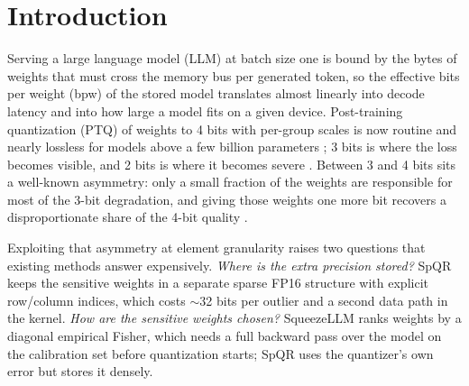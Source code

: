 \documentclass{article}
\begin{document}
\printAffiliationsAndNotice{}

\section{Introduction}
\label{sec:intro}

Serving a large language model (LLM) at batch size one is bound by the
bytes of weights that must cross the memory bus per generated token, so
the effective bits per weight (bpw) of the stored model translates almost
linearly into decode latency and into how large a model fits on a given
device. Post-training quantization (PTQ) of weights to 4 bits with
per-group scales is now routine and nearly lossless for models above a
few billion parameters \citep{frantar2023gptq,lin2024awq}; 3 bits is
where the loss becomes visible, and 2 bits is where it becomes severe
\citep{chee2023quip,egiazarian2024aqlm}. Between 3 and 4 bits sits a
well-known asymmetry: only a small fraction of the weights are
responsible for most of the 3-bit degradation, and giving those weights
one more bit recovers a disproportionate share of the 4-bit quality
\citep{dettmers2024spqr,kim2024squeezellm}.

Exploiting that asymmetry at element granularity raises two questions
that existing methods answer expensively. \emph{Where is the extra
precision stored?} SpQR \citep{dettmers2024spqr} keeps the sensitive
weights in a separate sparse FP16 structure with explicit row/column
indices, which costs $\sim$32 bits per outlier and a second data path in
the kernel. \emph{How are the sensitive weights chosen?} SqueezeLLM
\citep{kim2024squeezellm} ranks weights by a diagonal empirical Fisher,
which needs a full backward pass over the model on the calibration set
before quantization starts; SpQR uses the quantizer's own error but
stores it densely.
\end{document}
